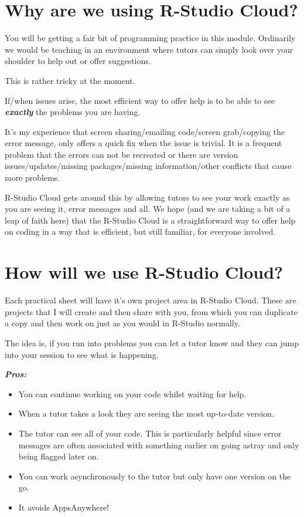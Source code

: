 \documentclass[
  openany]{book}
\providecommand{\tightlist}{%
  \setlength{\itemsep}{0pt}\setlength{\parskip}{0pt}}
\begin{document}
\hypertarget{why-are-we-using-r-studio-cloud}{%
\section*{Why are we using R-Studio Cloud?}\label{why-are-we-using-r-studio-cloud}}

You will be getting a fair bit of programming practice in this module. Ordinarily we would be teaching in an environment where tutors can simply look over your shoulder to help out or offer suggestions.

This is rather tricky at the moment.

If/when issues arise, the most efficient way to offer help is to be able to see \textbf{\emph{exactly}} the problems you are having.

It's my experience that screen sharing/emailing code/screen grab/copying the error message, only offers a quick fix when the issue is trivial. It is a frequent problem that the errors can not be recreated or there are version issues/updates/missing packages/missing information/other conflicts that cause more problems.

R-Studio Cloud gets around this by allowing tutors to see your work exactly as you are seeing it, error messages and all. We hope (and we are taking a bit of a leap of faith here) that the R-Studio Cloud is a straightforward way to offer help on coding in a way that is efficient, but still familiar, for everyone involved.

\hypertarget{how-will-we-use-r-studio-cloud}{%
\section*{How will we use R-Studio Cloud?}\label{how-will-we-use-r-studio-cloud}}

Each practical sheet will have it's own project area in R-Studio Cloud. These are projects that I will create and then share with you, from which you can duplicate a copy and then work on just as you would in R-Studio normally.

The idea is, if you run into problems you can let a tutor know and they can jump into your session to see what is happening.

\textbf{\emph{Pros:}}

\begin{itemize}
\tightlist
\item
  You can continue working on your code whilst waiting for help.
\item
  When a tutor takes a look they are seeing the most up-to-date version.
\item
  The tutor can see all of your code. This is particularly helpful since error messages are often associated with something earlier on going astray and only being flagged later on.
\item
  You can work asynchronously to the tutor but only have one version on the go.
\item
  It avoids AppsAnywhere!
\end{itemize}
\end{document}
